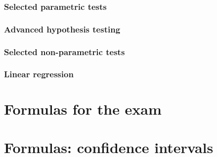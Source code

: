 \documentclass{article}
\begin{document}
\begin{multicols}{2}

\end{multicols}

\newpage

\subsubsection{Selected parametric tests}

\begin{multicols}{2}

\end{multicols}

\newpage

\subsubsection{Advanced hypothesis testing}

\begin{multicols}{2}

\end{multicols}

\subsubsection{Selected non-parametric tests}

\begin{multicols}{2}

\end{multicols}

\newpage

\subsubsection{Linear regression}

\begin{multicols}{2}

\end{multicols}

\newpage

\hspace{0pt}

\newpage

\thispagestyle{empty}

\section{Formulas for the exam}

\section*{Formulas: confidence intervals}
\begin{multicols}{3}

\end{multicols}
\end{document}
